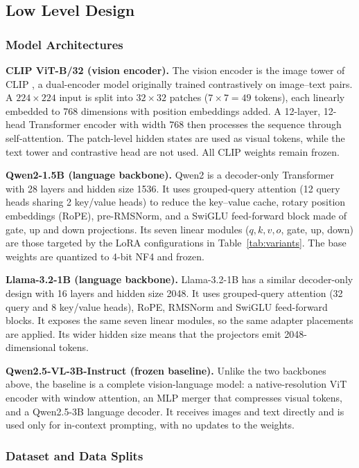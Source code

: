 \documentclass[conference]{IEEEtran}
\begin{document}
\subsection{Low Level Design}

\subsubsection{Model Architectures}\label{sec:arch}

\textbf{CLIP ViT-B/32 (vision encoder).} The vision encoder is the image tower of CLIP \cite{radford2021}, a dual-encoder model originally trained contrastively on image--text pairs. A $224\times224$ input is split into $32\times32$ patches ($7\times7=49$ tokens), each linearly embedded to 768 dimensions with position embeddings added. A 12-layer, 12-head Transformer encoder with width 768 then processes the sequence through self-attention. The patch-level hidden states are used as visual tokens, while the text tower and contrastive head are not used. All CLIP weights remain frozen.

\textbf{Qwen2-1.5B (language backbone).} Qwen2 \cite{qwen2,mithan} is a decoder-only Transformer with 28 layers and hidden size 1536. It uses grouped-query attention (12 query heads sharing 2 key/value heads) to reduce the key--value cache, rotary position embeddings (RoPE), pre-RMSNorm, and a SwiGLU feed-forward block made of gate, up and down projections. Its seven linear modules ($q,k,v,o$, gate, up, down) are those targeted by the LoRA configurations in Table~\ref{tab:variants}. The base weights are quantized to 4-bit NF4 and frozen.

\textbf{Llama-3.2-1B (language backbone).} Llama-3.2-1B \cite{llama32} has a similar decoder-only design with 16 layers and hidden size 2048. It uses grouped-query attention (32 query and 8 key/value heads), RoPE, RMSNorm and SwiGLU feed-forward blocks. It exposes the same seven linear modules, so the same adapter placements are applied. Its wider hidden size means that the projectors emit 2048-dimensional tokens.

\textbf{Qwen2.5-VL-3B-Instruct (frozen baseline).} Unlike the two backbones above, the baseline \cite{bai2025} is a complete vision-language model: a native-resolution ViT encoder with window attention, an MLP merger that compresses visual tokens, and a Qwen2.5-3B language decoder. It receives images and text directly and is used only for in-context prompting, with no updates to the weights.

\subsubsection{Dataset and Data Splits}\label{sec:dataset}
\end{document}
